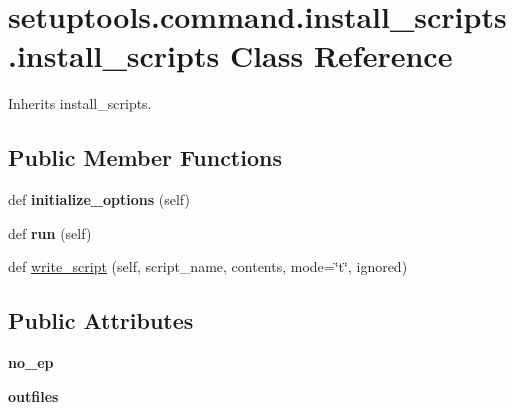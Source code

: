 \hypertarget{classsetuptools_1_1command_1_1install__scripts_1_1install__scripts}{}\section{setuptools.\+command.\+install\+\_\+scripts.\+install\+\_\+scripts Class Reference}
\label{classsetuptools_1_1command_1_1install__scripts_1_1install__scripts}


Inherits install\+\_\+scripts.

\subsection*{Public Member Functions}
\begin{DoxyCompactItemize}
\item 
\mbox{\label{classsetuptools_1_1command_1_1install__scripts_1_1install__scripts_aa30384b8a35469d73e4da8b343f338a5}} 
def {\bfseries initialize\+\_\+options} (self)
\item 
\mbox{\label{classsetuptools_1_1command_1_1install__scripts_1_1install__scripts_a7be3bccb3d044a874127101f8ffd8dc8}} 
def {\bfseries run} (self)
\item 
def \hyperlink{classsetuptools_1_1command_1_1install__scripts_1_1install__scripts_a6adf5034843d12224638090ba6720aac}{write\+\_\+script} (self, script\+\_\+name, contents, mode=\char`\"{}t\char`\"{}, ignored)
\end{DoxyCompactItemize}
\subsection*{Public Attributes}
\begin{DoxyCompactItemize}
\item 
\mbox{\label{classsetuptools_1_1command_1_1install__scripts_1_1install__scripts_ab3f8cf531a8e925503b2b9d598c48744}} 
{\bfseries no\+\_\+ep}
\item 
\mbox{\label{classsetuptools_1_1command_1_1install__scripts_1_1install__scripts_a1405b8119b7dce643aeb6f477bd7947f}} 
{\bfseries outfiles}
\end{DoxyCompactItemize}


